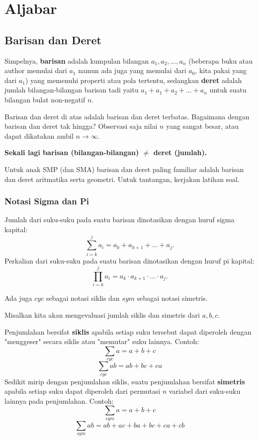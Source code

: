 \section{Aljabar}
    \subsection{Barisan dan Deret}
    Simpelnya, \textbf{barisan} adalah kumpulan bilangan $a_1,a_2,\dots,a_n$ (beberapa buku atau author memulai dari $a_1$ namun ada juga yang memulai dari $a_0$, kita pakai yang dari $a_1$) yang memenuhi properti atau pola tertentu, sedangkan \textbf{deret} adalah jumlah bilangan-bilangan barisan tadi yaitu $a_1+a_1+a_2+\dots+a_n$ untuk suatu bilangan bulat non-negatif $n$.
    
    Barisan dan deret di atas adalah barisan dan deret terbatas. Bagaimana dengan barisan dan deret tak hingga? Observasi saja nilai $n$ yang sangat besar, atau dapat dikatakan ambil $n \rightarrow \infty.$
    
    \textbf{Sekali lagi barisan (bilangan-bilangan) $\neq$ deret (jumlah).}
    
    Untuk anak SMP (dan SMA) barisan dan deret paling familiar adalah barisan dan deret aritmatika serta geometri. Untuk tantangan, kerjakan latihan soal.
    
    \subsubsection{Notasi Sigma dan Pi}
    Jumlah dari suku-suku pada suatu barisan dinotasikan dengan huruf sigma kapital:
    $$\sum_{i=k}^{j} a_i = a_k+a_{k+1}+\dots+a_j.$$
    Perkalian dari suku-suku pada suatu barisan dinotasikan dengan huruf pi kapital:
    $$\prod_{i=k}^{j} a_i = a_k \cdot a_{k+1}\cdot \ldots \cdot a_j.$$
    
    Ada juga $cyc$ sebagai notasi siklis dan $sym$ sebagai notasi simetris.
    
    Misalkan kita akan mengevaluasi jumlah siklis dan simetris dari $a,b,c$.
    
    Penjumlahan bersifat \textbf{siklis} apabila setiap suku tersebut dapat diperoleh dengan "menggeser" secara siklis atau "memutar" suku lainnya.
    Contoh: $$\sum_{cyc} a = a+b+c$$
         $$\sum_{cyc} ab = ab+ bc + ca$$
    Sedikit mirip dengan penjumlahan siklis, suatu penjumlahan bersifat \textbf{simetris} apabila setiap suku dapat diperoleh dari permutasi $n$ variabel dari suku-suku lainnya pada penjumlahan. Contoh: 
        $$\sum_{sym} a = a+b+c$$
        $$\sum_{sym} ab = ab+ ac + ba + bc + ca + cb$$
    
